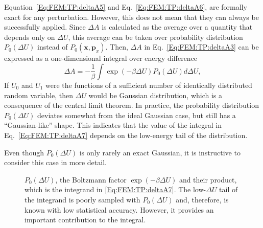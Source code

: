 Equation~\ref{Eq:FEM:TP:deltaA5} and Eq.~\ref{Eq:FEM:TP:deltaA6}, are formally exact for any perturbation. However, this does not mean that they can always be successfully applied. Since $\Delta A$ is calculated as the average over a quantity that depends only on $\Delta U$, this average can be taken over probability distribution $P_0(\Delta U)$ instead of $P_{0}(\mathbf{x},\mathbf{p}_{x})$. Then, $\Delta A$ in Eq.~\ref{Eq:FEM:TP:deltaA3} can be expressed as a one-dimensional integral over energy difference
\begin{equation}
\Delta A = -\frac{1}{\beta} \int \exp(-\beta \Delta U) P_{0}(\Delta U) d\Delta U,
\label{Eq:FEM:TP:deltaA7}
\end{equation}
If $U_{0}$ and $U_{1}$ were the functions of a sufficient number of identically distributed random variable, then $\Delta U$ would be Gaussian distribution, which is a consequence of the central limit theorem. In practice, the probability distribution $P_{0}(\Delta U)$ deviates somewhat from the ideal Gaussian case, but still has a ``Gaussian-like'' shape. This indicates that the value of the integral in Eq.~\ref{Eq:FEM:TP:deltaA7} depends on the low-energy tail of the distribution.

Even though $P_{0}(\Delta U)$ is only rarely an exact Gaussian, it is instructive to consider this case in more detail. 
\begin{figure}
	\centering
	\caption{$P_{0}(\Delta U)$, the Boltzmann factor $\exp(-\beta \Delta U)$ and their product, which is the integrand in \ref{Eq:FEM:TP:deltaA7}. The low-$\Delta U$ tail of the integrand is poorly sampled with $P_{0}(\Delta U)$ and, therefore, is known with low statistical accuracy. However, it provides an important contribution to the integral.}\label{Fig:TP:Pdistribution}
\end{figure}

